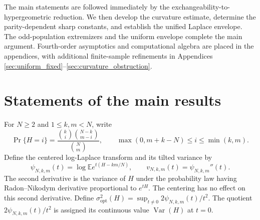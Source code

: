 \documentclass[11pt,a4paper]{article}
\DeclareMathOperator{\Var}{Var}\DeclareMathOperator{\Cov}{Cov}\DeclareMathOperator{\Hyp}{Hyp}\DeclareMathOperator{\Bern}{Bern}\DeclareMathOperator{\supp}{supp}\DeclareMathOperator{\artanh}{artanh}
\newcommand{\E}{\mathbb E}\newcommand{\R}{\mathbb R}\newcommand{\N}{\mathbb N}\newcommand{\one}{\mathbf1}
\begin{document}
The main statements are followed immediately by the exchangeability-to-hypergeometric reduction. We then develop the curvature estimate, determine the parity-dependent sharp constants, and establish the unified Laplace envelope. The odd-population extremizers and the uniform envelope complete the main argument. Fourth-order asymptotics and computational algebra are placed in the appendices, with additional finite-sample refinements in Appendices \ref{sec:uniform_fixed}--\ref{sec:curvature_obstruction}.

\section{Statements of the main results}\label{sec:main}
For $N\ge2$ and $1\le k,m<N$, write
\begin{equation}\label{eq:hypergeom}
 \Pr\{H=i\}=\frac{\binom ki\binom{N-k}{m-i}}{\binom Nm},
 \qquad \max(0,m+k-N)\le i\le\min(k,m).
\end{equation}
Define the centered log-Laplace transform and its tilted variance by
\begin{equation}\label{eq:psi}
 \psi_{N,k,m}(t)=\log\E e^{t(H-km/N)},\qquad
 v_{N,k,m}(t)=\psi_{N,k,m}''(t).
\end{equation}
The second derivative is the variance of $H$ under the probability law having Radon--Nikodym derivative proportional to $e^{tH}$. The centering has no effect on this second derivative. Define $\sigma^2_{\mathrm{opt}}(H)=\sup_{t\ne0}2\psi_{N,k,m}(t)/t^2$. The quotient $2\psi_{N,k,m}(t)/t^2$ is assigned its continuous value $\Var(H)$ at $t=0$.
\end{document}
